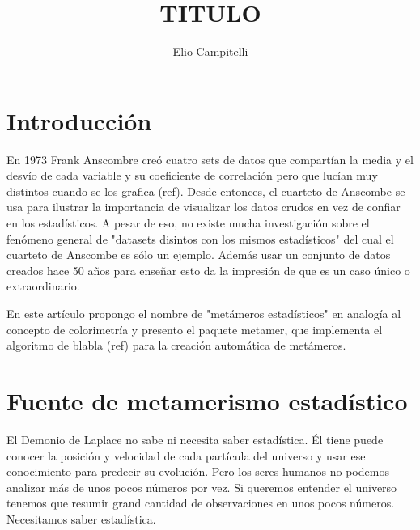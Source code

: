 \documentclass[runningheads,13pt]{llncs}\usepackage{knitr}
\begin{document}
\title{TITULO}

%
\author{Elio Campitelli}

%
%
%
\maketitle              %





\section{Introducción}

En 1973 Frank Anscombre creó cuatro sets de datos que compartían la media y el desvío de cada variable y su coeficiente de correlación pero que lucían muy distintos cuando se los grafica (ref). Desde entonces, el cuarteto de Anscombe se usa para ilustrar la importancia de visualizar los datos crudos en vez de confiar en los estadísticos. A pesar de eso, no existe mucha investigación sobre el fenómeno general de "datasets disintos con los mismos estadísticos" del cual el cuarteto de Anscombe es sólo un ejemplo. Además usar un conjunto de datos creados hace 50 años para enseñar esto da la impresión de que es un caso único o extraordinario. 

En este artículo propongo el nombre de "metámeros estadísticos" en analogía al concepto de colorimetría y presento el paquete metamer, que implementa el algoritmo de blabla (ref) para la creación automática de metámeros. 

\section{Fuente de metamerismo estadístico}

El Demonio de Laplace no sabe ni necesita saber estadística. Él tiene puede conocer la posición y velocidad de cada partícula del universo y usar ese conocimiento para predecir su evolución. Pero los seres humanos no podemos analizar más de unos pocos números por vez. Si queremos entender el universo tenemos que resumir grand cantidad de observaciones en unos pocos números. Necesitamos saber estadística.
\end{document}
